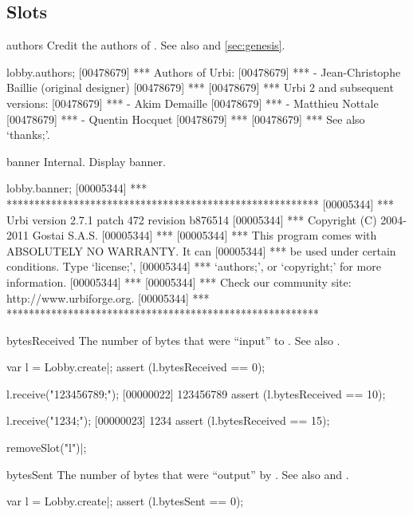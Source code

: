 \subsection{Slots}
\begin{urbiscriptapi}
\item[authors] Credit the authors of \usdk.  See also  and
  \autoref{sec:genesis}.
\begin{urbiscript}
lobby.authors;
[00478679] *** Authors of Urbi:
[00478679] ***  - Jean-Christophe Baillie (original designer)
[00478679] ***
[00478679] *** Urbi 2 and subsequent versions:
[00478679] ***  - Akim Demaille
[00478679] ***  - Matthieu Nottale
[00478679] ***  - Quentin Hocquet
[00478679] ***
[00478679] *** See also `thanks;'.
\end{urbiscript}

\item[banner] Internal.  Display \usdk banner.
\begin{urbiscript}
lobby.banner;
[00005344] *** ********************************************************
[00005344] *** Urbi version 2.7.1 patch 472 revision b876514
[00005344] *** Copyright (C) 2004-2011 Gostai S.A.S.
[00005344] ***
[00005344] *** This program comes with ABSOLUTELY NO WARRANTY.  It can
[00005344] *** be used under certain conditions.  Type `license;',
[00005344] *** `authors;', or `copyright;' for more information.
[00005344] ***
[00005344] *** Check our community site: http://www.urbiforge.org.
[00005344] *** ********************************************************
\end{urbiscript}

\item[bytesReceived] The number of bytes that were ``input'' to \this.  See
  also .
\begin{urbiscript}
var l = Lobby.create|;
assert (l.bytesReceived == 0);

l.receive("123456789;");
[00000022] 123456789
assert (l.bytesReceived == 10);

l.receive("1234;");
[00000023] 1234
assert (l.bytesReceived == 15);
\end{urbiscript}

\begin{urbicomment}
removeSlot("l")|;
\end{urbicomment}

\item[bytesSent] The number of bytes that were ``output'' by \this.  See
  also  and .
\begin{urbiscript}
var l = Lobby.create|;
assert (l.bytesSent == 0);


\end{urbiscript}
\end{urbiscriptapi}
